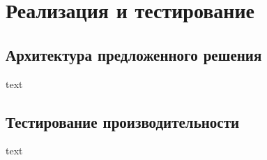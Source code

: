 \section{Реализация и тестирование}

\subsection{Архитектура предложенного решения}
text

\subsection{Тестирование производительности}
text